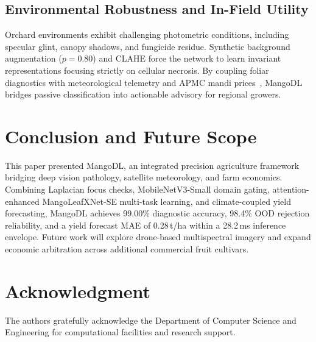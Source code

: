 \documentclass[conference]{IEEEtran}
\begin{document}
\subsection{Environmental Robustness and In-Field Utility}
Orchard environments exhibit challenging photometric conditions, including specular glint, canopy shadows, and fungicide residue. Synthetic background augmentation ($p=0.80$) and CLAHE force the network to learn invariant representations focusing strictly on cellular necrosis. By coupling foliar diagnostics with meteorological telemetry and APMC mandi prices~\cite{apeda2024mango,icar2023mango}, MangoDL bridges passive classification into actionable advisory for regional growers.

\section{Conclusion and Future Scope}
This paper presented MangoDL, an integrated precision agriculture framework bridging deep vision pathology, satellite meteorology, and farm economics. Combining Laplacian focus checks, MobileNetV3-Small domain gating, attention-enhanced MangoLeafXNet-SE multi-task learning, and climate-coupled yield forecasting, MangoDL achieves 99.00\% diagnostic accuracy, 98.4\% OOD rejection reliability, and a yield forecast MAE of 0.28\,t/ha within a 28.2\,ms inference envelope. Future work will explore drone-based multispectral imagery and expand economic arbitration across additional commercial fruit cultivars.

\section*{Acknowledgment}
The authors gratefully acknowledge the Department of Computer Science and Engineering for computational facilities and research support.




\end{document}
